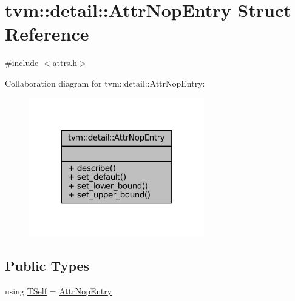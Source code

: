 \hypertarget{structtvm_1_1detail_1_1AttrNopEntry}{}\section{tvm\+:\+:detail\+:\+:Attr\+Nop\+Entry Struct Reference}
\label{structtvm_1_1detail_1_1AttrNopEntry}


{\ttfamily \#include $<$attrs.\+h$>$}



Collaboration diagram for tvm\+:\+:detail\+:\+:Attr\+Nop\+Entry\+:
\nopagebreak
\begin{figure}[H]
\begin{center}
\leavevmode
\includegraphics[width=216pt]{structtvm_1_1detail_1_1AttrNopEntry__coll__graph}
\end{center}
\end{figure}
\subsection*{Public Types}
\begin{DoxyCompactItemize}
\item 
using \hyperlink{structtvm_1_1detail_1_1AttrNopEntry_adab25bf47ec60e73d1e02c3cef2f6898}{T\+Self} = \hyperlink{structtvm_1_1detail_1_1AttrNopEntry}{Attr\+Nop\+Entry}
\end{DoxyCompactItemize}
